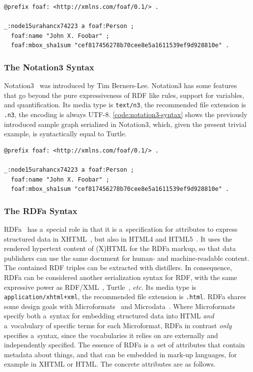 \begin{lstlisting}[caption={[Sample graph in Turtle syntax]{Sample graph in Turtle syntax,
  the syntax is equivalent to \autoref{code:notation3-syntax}}},
  label={code:turtle-syntax}]
@prefix foaf: <http://xmlns.com/foaf/0.1/> .

_:node15urahancx74223 a foaf:Person ;
  foaf:name "John X. Foobar" ;
  foaf:mbox_sha1sum "cef817456278b70cee8e5a1611539ef9d928810e" .
\end{lstlisting}

\subsubsection{The Notation3 Syntax} \label{sec:notation3}

Notation3~\cite{bernerslee2011notation3} was introduced
by Tim Berners-Lee.
Notation3 has some features that go beyond
the pure expressiveness of RDF like rules,
support for variables, and quantification.
Its media type is \texttt{text/n3},
the recommended file extension is \texttt{.n3},
the encoding is always UTF-8.
\autoref{code:notation3-syntax} shows the previously
introduced sample graph serialized in Notation3,
which, given the present trivial example,
is syntactically equal to Turtle.

\pagebreak
\begin{lstlisting}[caption={Sample graph in Notation3 syntax},
  label={code:notation3-syntax}]
@prefix foaf: <http://xmlns.com/foaf/0.1/> .

_:node15urahancx74223 a foaf:Person ;
  foaf:name "John X. Foobar" ;
  foaf:mbox_sha1sum "cef817456278b70cee8e5a1611539ef9d928810e" .
\end{lstlisting}

\subsubsection{The RDFa Syntax}

RDFa~\cite{adida2012rdfa} has a~special role
in that it is a~specification for attributes
to express structured data in XHTML~\cite{pemberton2000xhtml},
but also in HTML4 and HTML5~\cite{sporny2012htmlrdfa}.
It uses the rendered hypertext content of (X)HTML
for the RDFa markup,
so that data publishers can use the same document
for human- and machine-readable content.
The contained RDF triples can be extracted with distillers.
In consequence, RDFa can be considered
another serialization syntax for RDF,
with the same expressive power as
RDF/XML~\cite{beckett2004rdfxml},
Turtle~\cite{prudhommeaux2013turtle}, \emph{etc.}
Its media type is \texttt{application/xhtml+xml},
the recommended file extension is \texttt{.html}.
RDFa shares some design goals
with Microformats~\cite{celik2006microformats}
and Microdata~\cite{hickson2012microdata}.
Where Microformats specify both a~syntax
for embedding structured data into HTML
\emph{and} a~vocabulary of specific terms for each Microformat,
RDFa in contrast \emph{only} specifies a~syntax,
since the vocabularies it relies on
are externally and independently specified.
The essence of RDFa is a~set of attributes
that contain metadata about things,
and that can be embedded in mark-up languages,
for example in XHTML or HTML.
The concrete attributes are as follows.

